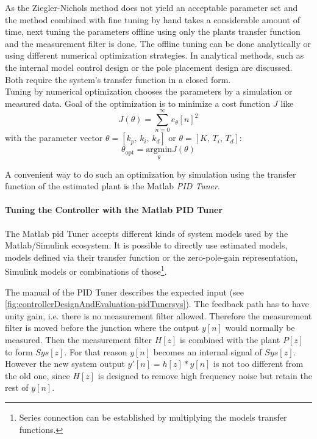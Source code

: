 As the Ziegler-Nichols method does not yield an acceptable parameter set and the method combined with fine tuning by hand takes a considerable amount of time, next tuning the parameters offline using only the plants transfer function and the measurement filter is done.
The offline tuning can be done analytically or using different numerical optimization strategies. In \cite{DiazRodriguez2019} analytical methods, such as the internal model control design or the pole placement design are discussed. Both require the system's transfer function in a closed form.\\
Tuning by numerical optimization chooses the parameters by a simulation or measured data. Goal of the optimization is to minimize a cost function $J$ like
\begin{equation}
J(\theta) = \sum_{n=0}^{\infty} e_{\theta}[n]^2
\end{equation}
with the parameter vector $\theta=[k_p,\,k_i,\,k_d]$ or $\theta=[K,\,T_i,\,T_d]$:
\begin{equation}
\theta_\text{opt} = \underset{\theta}{\text{argmin}} J(\theta)
\end{equation}

A convenient way to do such an optimization by simulation using the transfer function of the estimated plant is the Matlab \textit{PID Tuner}.

\paragraph{Tuning the Controller with the Matlab PID Tuner}
The Matlab \gls{pid} Tuner accepts different kinds of system models used by the Matlab/Simulink ecosystem. It is possible to directly use estimated models, models defined via their transfer function or the zero-pole-gain representation, Simulink models or combinations of those\footnote{Series connection can be established by multiplying the models transfer functions.}.

The manual of the PID Tuner\cite{pidTunerMan} describes the expected input (see \autoref{fig:controllerDesignAndEvaluation-pidTunersys}). The feedback path has to have unity gain, i.e. there is no measurement filter allowed. Therefore the measurement filter is moved before the junction where the output $y[n]$ would normally be measured. Then the measurement filter $H[z]$ is combined with the plant $P[z]$ to form $Sys[z]$. For that reason $y[n]$ becomes an internal signal of $Sys[z]$. However the new system output $y'[n]=h[z] \ast y[n]$ is not too different from the old one, since $H[z]$ is designed to remove high frequency noise but retain the rest of $y[n]$.

